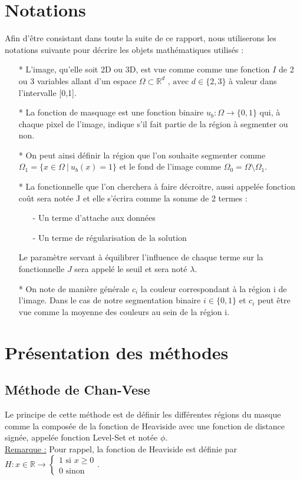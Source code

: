 \documentclass{report}
\begin{document}
\section{Notations}
\label{S-Notations}
Afin d'être consistant dans toute la suite de ce rapport, nous utiliserons les notations suivante pour décrire les objets mathématiques utilisés :
\begin{itemize}
	\item[*] L'image, qu'elle soit 2D ou 3D, est vue comme comme une fonction $I$ de 2 ou 3 variables allant d'un espace $\Omega \subset \mathbb{R}^d \text{ , avec }d \in \{2,3\}$ à valeur dans l'intervalle [0,1].
	\item[*] La fonction de masquage est une fonction binaire $u_b:\Omega \rightarrow \{0,1\}$ qui, à chaque pixel de l'image, indique s'il fait partie de la région à segmenter ou non.
	\item[*] On peut ainsi définir la région que l'on souhaite segmenter comme $\Omega_1=\{x\in \Omega ~|~ u_b(x)=1\}$ et le fond de l'image comme $\Omega_0=\Omega \setminus \Omega_1$.
	\item[*] La fonctionnelle que l'on cherchera à faire décroitre, aussi appelée fonction coût sera notée J et elle s'écrira comme la somme de 2 termes : 
	\begin{itemize}
		\item[-] Un terme d'attache aux données
		\item[-] Un terme de régularisation de la solution		
	\end{itemize}
	Le paramètre servant à équilibrer l'influence de chaque terme sur la fonctionnelle $J$ sera appelé le seuil et sera noté $\lambda$.
	\item[*] On note de manière générale $c_i$ la couleur correspondant à la région i de l'image. Dans le cas de notre segmentation binaire $i\in \{0,1\}$ et $c_i$ peut être vue comme la moyenne des couleurs au sein de la région i. 
\end{itemize}
\section{Présentation des méthodes}
\label{S-Présentation des méthodes}
\subsection{Méthode de Chan-Vese}
\label{S-Méthode de Chan-Vese}
Le principe de cette méthode est de définir les différentes régions du masque comme la composée de la fonction de Heaviside avec une fonction de distance signée, appelée fonction Level-Set et notée $\phi$.\\
\underline{Remarque :} Pour rappel, la fonction de Heaviside est définie par $H:x\in \mathbb{R}\rightarrow \begin{cases} 1 \text{ si } x\geq 0 \\ 0 \text{ sinon}\end{cases}$.
\end{document}
